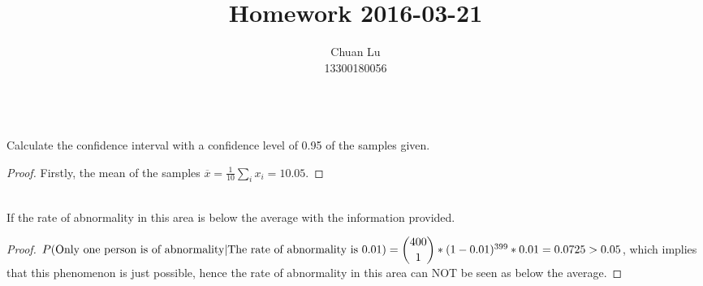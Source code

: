 \documentclass{article}
\newenvironment{problem}[2][Problem]{\begin{trivlist}
\item[\hskip \labelsep {\bfseries #1}\hskip \labelsep {\bfseries #2.}]}{\end{trivlist}}
\begin{document}
\title{Homework 2016-03-21}
\author{Chuan Lu\\
13300180056}

\maketitle

\begin{problem}{1}
\text{ }\\
Calculate the confidence interval with a confidence level of 0.95 of the samples given.
\end{problem}
\begin{proof}
Firstly, the mean of the samples $\overline{x} = \frac{1}{10}\sum_{i}{x_{i}} = 10.05.$
\end{proof}


\begin{problem}{2}
\text{ }\\
If the rate of abnormality in this area is below the average with the information provided.
\end{problem}
\begin{proof}
$P(\mbox{Only one person is of abnormality}\vert\mbox{The rate of abnormality is 0.01}) =  \dbinom{400}{1}*(1-0.01)^{399}*0.01 = 0.0725 > 0.05$, which implies that this phenomenon is just possible, hence the rate of abnormality in this area can NOT be seen as below the average.
\end{proof}


\end{document}
